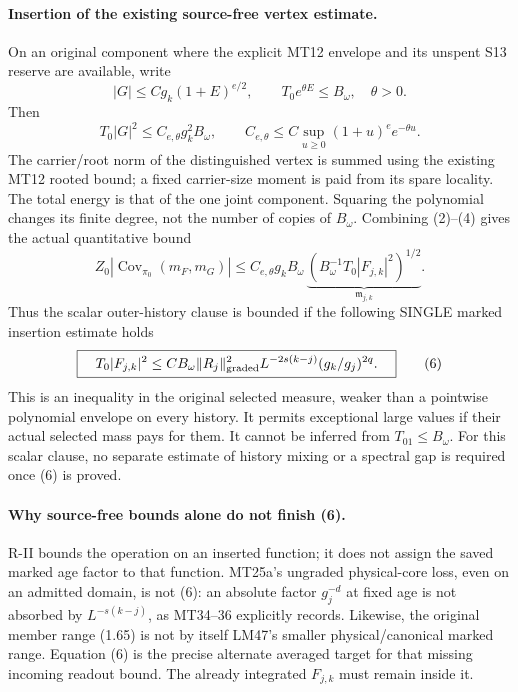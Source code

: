 \documentclass[11pt]{article}
\newcommand{\Cov}{\operatorname{Cov}}
\begin{document}
\paragraph{Insertion of the existing source-free vertex estimate.}
On an original component where the explicit MT12 envelope and its unspent S13
reserve are available, write
\[
 |G|\le Cg_k(1+E)^{e/2},\qquad
 T_0 e^{\theta E}\le B_\omega,\quad \theta>0.              \tag{3}
\]
Then
\[
 T_0|G|^2\le C_{e,\theta}g_k^2 B_\omega,\qquad
 C_{e,\theta}\le C\sup_{u\ge0}(1+u)^e e^{-\theta u}.      \tag{4}
\]
The carrier/root norm of the distinguished vertex is summed using the existing
MT12 rooted bound; a fixed carrier-size moment is paid from its spare locality.
The total energy is that of the one joint component. Squaring the polynomial
changes its finite degree, not the number of copies of $B_\omega$.
Combining (2)--(4) gives the actual quantitative bound
\[
 Z_0|\Cov_{\pi_0}(m_F,m_G)|
 \le C_{e,\theta}g_k B_\omega\,
       \underbrace{\left(B_\omega^{-1}T_0|F_{j,k}|^2\right)^{1/2}}_{\mathfrak m_{j,k}}.
                                                               \tag{5}
\]
Thus the scalar outer-history clause is bounded if the following SINGLE marked insertion estimate holds
\[
 \boxed{\quad T_0|F_{j,k}|^2
 \le C B_\omega\|R_j\|_{\rm graded}^2
       L^{-2s(k-j)}(g_k/g_j)^{2q}.\quad}                  \tag{6}
\]
This is an inequality in the original selected measure, weaker than a pointwise
polynomial envelope on every history. It permits exceptional large values if their
actual selected mass pays for them. It cannot be inferred from $T_01\le B_\omega$.
For this scalar clause, no separate estimate of history mixing or a spectral gap
is required once (6) is proved.

\paragraph{Why source-free bounds alone do not finish (6).}
R-II bounds the operation on an inserted function; it does not assign the saved
marked age factor to that function. MT25a's ungraded physical-core loss, even on
an admitted domain, is not (6): an absolute factor $g_j^{-d}$ at fixed age is not
absorbed by $L^{-s(k-j)}$, as MT34--36 explicitly records. Likewise, the original
member range (1.65) is not by itself LM47's smaller physical/canonical marked
range. Equation (6) is the precise alternate averaged target for that missing
incoming readout bound. The already integrated $F_{j,k}$ must remain inside it.
\end{document}
